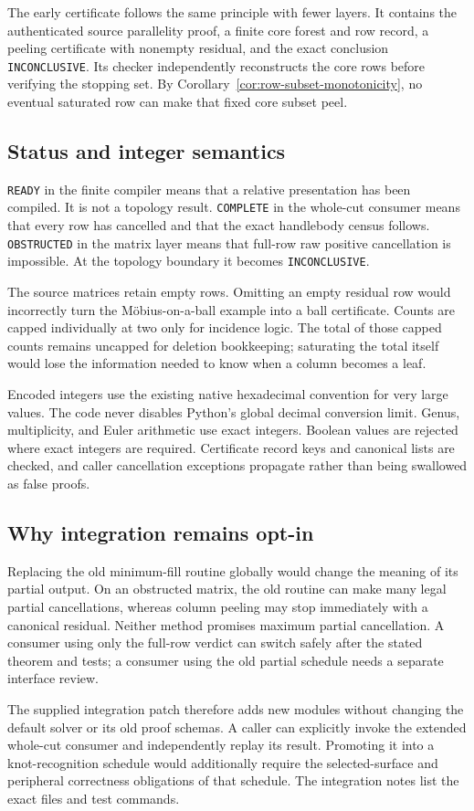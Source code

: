 The early certificate follows the same principle with fewer layers.  It
contains the authenticated source parallelity proof, a finite core forest
and row record, a peeling certificate with nonempty residual, and the exact
conclusion \texttt{INCONCLUSIVE}.  Its checker independently reconstructs
the core rows before verifying the stopping set.  By
Corollary~\ref{cor:row-subset-monotonicity}, no eventual saturated row can
make that fixed core subset peel.

\subsection{Status and integer semantics}

\texttt{READY} in the finite compiler means that a relative presentation
has been compiled.  It is not a topology result.  \texttt{COMPLETE} in the
whole-cut consumer means that every row has cancelled and that the exact
handlebody census follows.  \texttt{OBSTRUCTED} in the matrix layer means
that full-row raw positive cancellation is impossible.  At the topology
boundary it becomes \texttt{INCONCLUSIVE}.

The source matrices retain empty rows.  Omitting an empty residual row
would incorrectly turn the M\"obius-on-a-ball example into a ball
certificate.  Counts are capped individually at two only for incidence
logic.  The total of those capped counts remains uncapped for deletion
bookkeeping; saturating the total itself would lose the information needed
to know when a column becomes a leaf.

Encoded integers use the existing native hexadecimal convention for very
large values.  The code never disables Python's global decimal conversion
limit.  Genus, multiplicity, and Euler arithmetic use exact integers.
Boolean values are rejected where exact integers are required.  Certificate
record keys and canonical lists are checked, and caller cancellation
exceptions propagate rather than being swallowed as false proofs.

\subsection{Why integration remains opt-in}

Replacing the old minimum-fill routine globally would change the meaning
of its partial output.  On an obstructed matrix, the old routine can make
many legal partial cancellations, whereas column peeling may stop
immediately with a canonical residual.  Neither method promises maximum
partial cancellation.  A consumer using only the full-row verdict can
switch safely after the stated theorem and tests; a consumer using the
old partial schedule needs a separate interface review.

The supplied integration patch therefore adds new modules without changing
the default solver or its old proof schemas.  A caller can explicitly
invoke the extended whole-cut consumer and independently replay its result.
Promoting it into a knot-recognition schedule would additionally require
the selected-surface and peripheral correctness obligations of that
schedule.  The integration notes list the exact files and test commands.
